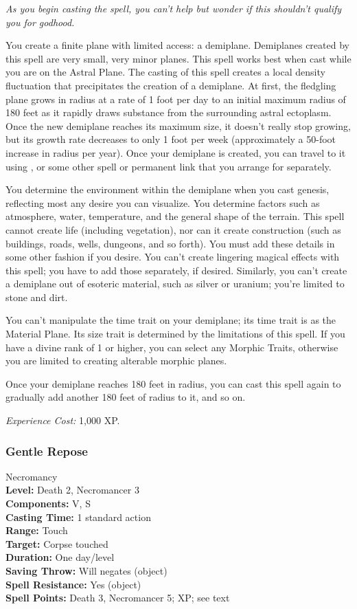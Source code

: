 \emph{As you begin casting the spell, you can't help but wonder if this shouldn't qualify you for godhood.}

You create a finite plane with limited access: a demiplane. 
Demiplanes created by this spell are very small, very minor planes. 
This spell works best when cast while you are on the Astral Plane. 
The casting of this spell creates a local density fluctuation that precipitates the creation of a demiplane. 
At first, the fledgling plane grows in radius at a rate of 1 foot per day to an initial maximum radius of 180 feet as it rapidly draws substance from the surrounding astral ectoplasm. 
Once the new demiplane reaches its maximum size, it doesn't really stop growing, 
but its growth rate decreases to only 1 foot per week (approximately a 50-foot increase in radius per year). 
Once your demiplane is created, you can travel to it using ,  
or some other spell or permanent link that you arrange for separately.

You determine the environment within the demiplane when you cast genesis, 
reflecting most any desire you can visualize. 
You determine factors such as atmosphere, water, temperature, and the general shape of the terrain. 
This spell cannot create life (including vegetation), nor can it create construction (such as buildings, roads, wells, dungeons, and so forth). 
You must add these details in some other fashion if you desire. 
You can't create lingering magical effects with this spell; you have to add those separately, if desired. 
Similarly, you can't create a demiplane out of esoteric material, such as silver or uranium; you're limited to stone and dirt. 

You can't manipulate the time trait on your demiplane; its time trait is as the Material Plane.
Its size trait is determined by the limitations of this spell.
If you have a divine rank of 1 or higher, you can select any Morphic Traits, otherwise you are limited to creating alterable morphic planes.

Once your demiplane reaches 180 feet in radius, you can cast this spell again to gradually add another 180 feet of radius to it, and so on.

\emph{Experience Cost:} 1,000 XP. 
\subsubsection{Gentle Repose}
\label{Spell:GentleRepose}
Necromancy
\\ \textbf{Level:} Death 2, Necromancer 3
\\ \textbf{Components:} V, S
\\ \textbf{Casting Time:} 1 standard action
\\ \textbf{Range:} Touch
\\ \textbf{Target:} Corpse touched
\\ \textbf{Duration:} One day/level
\\ \textbf{Saving Throw:} Will negates (object)
\\ \textbf{Spell Resistance:} Yes (object)
\\ \textbf{Spell Points:} Death 3, Necromancer 5; XP; see text

